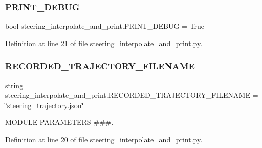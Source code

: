 \subsubsection{\texorpdfstring{PRINT\_DEBUG}{PRINT\_DEBUG}}
{\footnotesize\ttfamily bool steering\+\_\+interpolate\+\_\+and\+\_\+print.\+P\+R\+I\+N\+T\+\_\+\+D\+E\+B\+UG = True}



Definition at line 21 of file steering\+\_\+interpolate\+\_\+and\+\_\+print.\+py.

\mbox{\label{namespacesteering__interpolate__and__print_a43ff4edddfa844fcd5bfbcc0fb56991e}} 
\subsubsection{\texorpdfstring{RECORDED\_TRAJECTORY\_FILENAME}{RECORDED\_TRAJECTORY\_FILENAME}}
{\footnotesize\ttfamily string steering\+\_\+interpolate\+\_\+and\+\_\+print.\+R\+E\+C\+O\+R\+D\+E\+D\+\_\+\+T\+R\+A\+J\+E\+C\+T\+O\+R\+Y\+\_\+\+F\+I\+L\+E\+N\+A\+ME = \char`\"{}steering\+\_\+trajectory.\+json\char`\"{}}



M\+O\+D\+U\+LE P\+A\+R\+A\+M\+E\+T\+E\+RS \#\#\#. 



Definition at line 20 of file steering\+\_\+interpolate\+\_\+and\+\_\+print.\+py.

